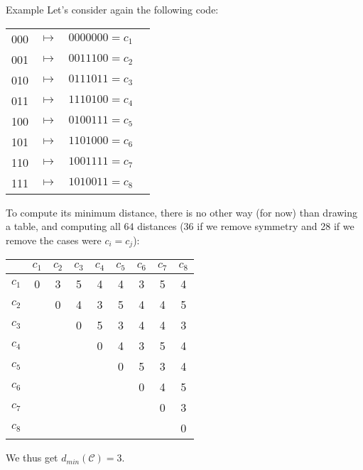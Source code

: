 \documentclass[a4paper]{article}
\begin{document}
\begin{parag}{Example}
    Let's consider again the following code:
    \begin{center}
    \begin{tabular}{cccc}
        000 & $\mapsto$ & $0000000 = c_1$ \\
        001 & $\mapsto$ & $0011100 = c_2$ \\
        010 & $\mapsto$ & $0111011 = c_3$ \\
        011 & $\mapsto$ & $1110100 = c_4$ \\
        100 & $\mapsto$ & $0100111 = c_5$ \\
        101 & $\mapsto$ & $1101000 = c_6$ \\
        110 & $\mapsto$ & $1001111 = c_7$ \\
        111 & $\mapsto$ & $1010011 = c_8$ 
    \end{tabular}
    \end{center}

    To compute its minimum distance, there is no other way (for now) than drawing a table, and computing all $64$ distances (36 if we remove symmetry and 28 if we remove the cases were $c_i = c_j$):

    \begin{center}
    \begin{tabular}{c|cccccccc}
        & $c_1$ & $c_2$ & $c_3$ & $c_4$ & $c_5$ & $c_6$ & $c_7$ & $c_8$ \\
        \hline
            $c_1$ & 0 & 3 & 5 & 4 & 4 & 3 & 5 & 4 \\ 
            $c_2$ &   & 0 & 4 & 3 & 5 & 4 & 4 & 5 \\ 
            $c_3$ &   &   & 0 & 5 & 3 & 4 & 4 & 3 \\ 
            $c_4$ &   &   &   & 0 & 4 & 3 & 5 & 4 \\ 
            $c_5$ &   &   &   &   & 0 & 5 & 3 & 4 \\ 
            $c_6$ &   &   &   &   &   & 0 & 4 & 5 \\ 
            $c_7$ &   &   &   &   &   &   & 0 & 3 \\ 
            $c_8$ &   &   &   &   &   &   &   & 0 \\ 
    \end{tabular}
    \end{center}

    We thus get $d_{min}\left(\mathcal{C}\right) = 3$.
\end{parag}
\end{document}
